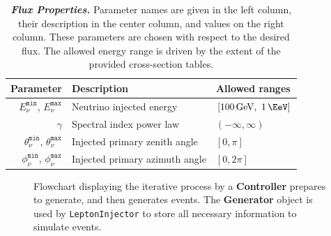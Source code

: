 \documentclass[main.tex]{subfiles}
\newcommand{\LeptonInjector}{\texttt{LeptonInjector}}
\begin{document}
\begin{table}[h!]
	\centering
    \begin{tabular}{r l  l}
        \toprule
        Parameter & Description & Allowed ranges \\
        \midrule
        $E_{\nu}^\texttt{min}$, $E_{\nu}^\texttt{max}$ & Neutrino injected energy & $ [\SI{100}\GeV,~\SI{1}\EeV]$ \\ %
        $\gamma$ & Spectral index power law & $  \left(-\infty,\infty\right)$ \\
        $\theta_{\nu}^\texttt{min}$, $\theta_{\nu}^\texttt{max}$ & Injected primary zenith angle & $\left[0,\pi\right]$ \\ 
        $\phi_{\nu}^\texttt{min}$, $\phi_{\nu}^\texttt{max}$ & Injected primary azimuth angle & $\left[0,2\pi\right]$ \\
        \bottomrule
    \end{tabular}
    \caption{\textbf{\textit{Flux Properties.}}
    Parameter names are given in the left column, their description in the center column, and values on the right column.
    These parameters are chosen with respect to the desired flux.
    The allowed energy range is driven by the extent of the provided cross-section tables.
    }
    \label{tbl:injection_parameters}
\end{table}

\begin{figure}[p]
    \centering
    \caption{Flowchart displaying the iterative process by a \textbf{Controller} prepares to generate, and then generates events. The \textbf{Generator} object is used by \LeptonInjector{} to store all necessary information to simulate events.}\label{fig:flow_LI}
\end{figure}
\end{document}
